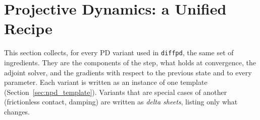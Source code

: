 
\providecommand{\RR}{\mathbb{R}}
\providecommand{\x}{\mathbf{x}}
\providecommand{\vv}{\mathbf{v}}
\providecommand{\f}{\mathbf{f}}
\providecommand{\bb}{\mathbf{b}}
\providecommand{\M}{\mathbf{M}}
\providecommand{\C}{\mathbf{C}}
\providecommand{\R}{\mathbf{R}}
\providecommand{\I}{\mathbf{I}}
\providecommand{\zero}{\mathbf{0}}
\providecommand{\z}{\mathbf{z}}
\providecommand{\e}{\mathbf{e}}
\providecommand{\p}{\mathbf{p}}
\providecommand{\dd}{\mathbf{d}}
\providecommand{\G}{\mathbf{G}}
\providecommand{\rr}{\mathbf{r}}
\providecommand{\J}{\mathbf{J}}
\providecommand{\LL}{\mathbf{L}}
\providecommand{\n}{\mathbf{n}}
\providecommand{\Kb}{\mathbf{K}}            %
\providecommand{\Db}{\mathbf{D}}            %
\providecommand{\Pb}{\mathbf{P}}            %
\providecommand{\Gc}{\mathcal{G}}           %
\providecommand{\tvb}{\mathbf{t}}           %
\providecommand{\vc}{\vv_{C}}               %
\providecommand{\TODO}[1]{\textcolor{red}{\textbf{TODO:} #1}}

\section{Projective Dynamics: a Unified Recipe}
\label{sec:npd}

\noindent This section collects, for every PD variant used in \texttt{diffpd}, the same set of
ingredients. They are the components of the step, what holds at convergence, the adjoint solver, and
the gradients with respect to the previous state and to every parameter. Each variant is written as
an instance of one template (Section~\ref{sec:npd_template}). Variants that are special cases of
another (frictionless contact, damping) are written as \emph{delta sheets}, listing only what changes.

